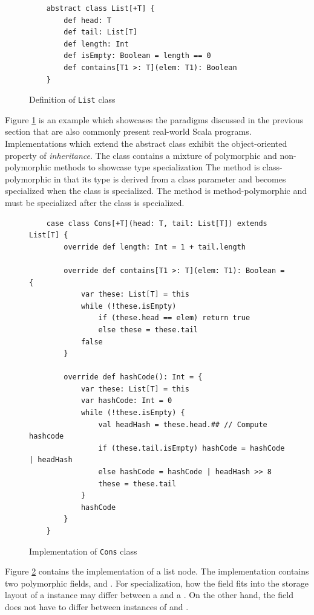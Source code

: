 \begin{figure}[!htb]
	\begin{verbatim}
	abstract class List[+T] {
		def head: T
		def tail: List[T]
		def length: Int
		def isEmpty: Boolean = length == 0
		def contains[T1 >: T](elem: T1): Boolean
	}
	\end{verbatim}
	\caption{Definition of \texttt{List} class}
	\label{example:list-def}
\end{figure}

Figure \ref{example:list-def} is an example which showcases the paradigms discussed in the previous section that are also commonly present real-world Scala programs.
Implementations which extend the abstract  class exhibit the object-oriented property of \textit{inheritance}.
The  class contains a mixture of polymorphic and non-polymorphic methods to showcase type specialization
The  method is class-polymorphic in that its type is derived from a class parameter and becomes specialized when the class is specialized.
The  method is method-polymorphic and must be specialized after the class is specialized.

\begin{figure}[!htb]
	\begin{verbatim}
	case class Cons[+T](head: T, tail: List[T]) extends List[T] {
		override def length: Int = 1 + tail.length
		
		override def contains[T1 >: T](elem: T1): Boolean = {
			var these: List[T] = this
			while (!these.isEmpty) 
				if (these.head == elem) return true
				else these = these.tail
			false
		}
			
		override def hashCode(): Int = {
			var these: List[T] = this
			var hashCode: Int = 0
			while (!these.isEmpty) {
				val headHash = these.head.## // Compute hashcode
				if (these.tail.isEmpty) hashCode = hashCode | headHash
				else hashCode = hashCode | headHash >> 8
				these = these.tail
			}
			hashCode
		}
	}
	\end{verbatim}
	\caption{Implementation of \texttt{Cons} class}
	\label{example:cons-impl}
\end{figure}

Figure \ref{example:cons-impl} contains the implementation of a list node.
The  implementation contains two polymorphic fields,  and .
For specialization, how the  field fits into the storage layout of a  instance may differ between a  and a .
On the other hand, the  field does not have to differ between instances of  and .

